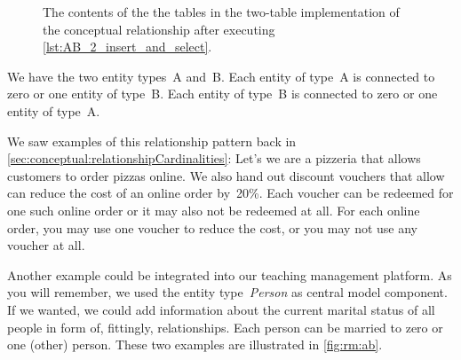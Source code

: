 %
%
%
%
%
%
%
\begin{figure}%
\centering%
\floatSep%
%
\floatSep%
%
\floatSep%
\caption{The contents of the the tables in the two-table implementation of the  conceptual relationship after executing \cref{lst:AB_2_insert_and_select}.}%
\label{fig:rm:ab:2:tables}%
\end{figure}%
%
%
%
We have the two entity types~A and~B.
Each entity of type~A is connected to zero or one entity of type~B.
Each entity of type~B is connected to zero or one entity of type~A.

We saw examples of this relationship pattern back in \cref{sec:conceptual:relationshipCardinalities}:
Let's we are a pizzeria that allows customers to order pizzas online.
We also hand out discount vouchers that allow can reduce the cost of an online order by~20\%.
Each voucher can be redeemed for one such online order or it may also not be redeemed at all.
For each online order, you may use one voucher to reduce the cost, or you may not use any voucher at all.

Another example could be integrated into our teaching management platform.
As you will remember, we used the entity type~\emph{Person} as central model component.
If we wanted, we could add information about the current marital status of all people in form of, fittingly, relationships.
Each person can be married to zero or one (other) person.
These two examples are illustrated in \cref{fig:rm:ab}.

